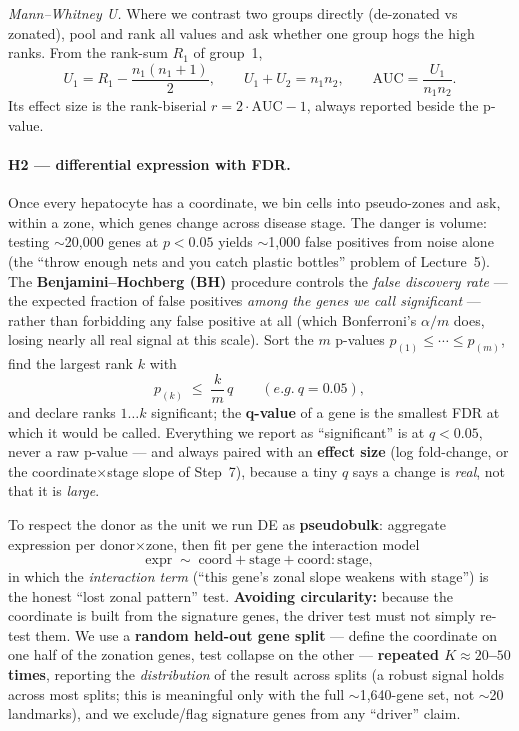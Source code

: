 \documentclass[11pt]{article}
\begin{document}
\emph{Mann--Whitney U.} Where we contrast two groups directly (de-zonated vs zonated), pool and rank all
values and ask whether one group hogs the high ranks. From the rank-sum $R_1$ of group~1,
\begin{equation}
U_1 = R_1 - \frac{n_1(n_1+1)}{2},\qquad U_1+U_2=n_1 n_2,\qquad \mathrm{AUC}=\frac{U_1}{n_1 n_2}.
\end{equation}
Its effect size is the rank-biserial $r = 2\cdot\mathrm{AUC}-1$, always reported beside the p-value.

\paragraph{H2 --- differential expression with FDR.} Once every hepatocyte has a coordinate, we bin
cells into pseudo-zones and ask, within a zone, which genes change across disease stage. The danger is
volume: testing $\sim$20{,}000 genes at $p<0.05$ yields $\sim$1{,}000 false positives from noise alone
(the ``throw enough nets and you catch plastic bottles'' problem of Lecture~5). The
\textbf{Benjamini--Hochberg (BH)} procedure controls the \emph{false discovery rate} --- the expected
fraction of false positives \emph{among the genes we call significant} --- rather than forbidding any
false positive at all (which Bonferroni's $\alpha/m$ does, losing nearly all real signal at this scale).
Sort the $m$ p-values $p_{(1)}\le\cdots\le p_{(m)}$, find the largest rank $k$ with
\begin{equation}
p_{(k)} \;\le\; \frac{k}{m}\,q \qquad (e.g.\ q=0.05),
\end{equation}
and declare ranks $1\ldots k$ significant; the \textbf{q-value} of a gene is the smallest FDR at which
it would be called. Everything we report as ``significant'' is at $q<0.05$, never a raw p-value --- and
always paired with an \textbf{effect size} (log fold-change, or the coordinate$\times$stage slope of
Step~7), because a tiny $q$ says a change is \emph{real}, not that it is \emph{large}.

To respect the donor as the unit we run DE as \textbf{pseudobulk}: aggregate expression per
donor$\times$zone, then fit per gene the interaction model
\begin{equation}
\text{expr} \;\sim\; \text{coord} + \text{stage} + \text{coord}{:}\text{stage},
\end{equation}
in which the \emph{interaction term} (``this gene's zonal slope weakens with stage'') is the honest
``lost zonal pattern'' test. \textbf{Avoiding circularity:} because the coordinate is built from the
signature genes, the driver test must not simply re-test them. We use a \textbf{random held-out gene
split} --- define the coordinate on one half of the zonation genes, test collapse on the other ---
\textbf{repeated $K\approx20$--$50$ times}, reporting the \emph{distribution} of the result across
splits (a robust signal holds across most splits; this is meaningful only with the full
$\sim$1{,}640-gene set, not $\sim$20 landmarks), and we exclude/flag signature genes from any ``driver'' claim.
\end{document}

